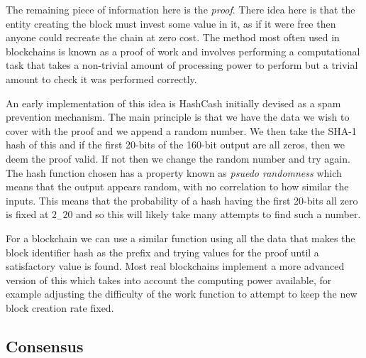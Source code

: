 The remaining piece of information here is the \emph{proof}. There idea here is that the entity creating the block must invest some value in it, as if it were free then anyone could recreate the chain at zero cost. The method most often used in blockchains is known as a proof of work and involves performing a computational task that takes a non-trivial amount of processing power to perform but a trivial amount to check it was performed correctly.

An early implementation of this idea is HashCash  initially devised as a spam prevention mechanism. The main principle is that we have the data we wish to cover with the proof and we append a random number. We then take the SHA-1 hash of this and if the first 20-bits of the 160-bit output are all zeros, then we deem the proof valid. If not then we change the random number and try again. The hash function chosen has a property known as \emph{psuedo randomness} which means that the output appears random, with no correlation to how similar the inputs. This means that the probability of a hash having the first 20-bits all zero is fixed at $2_-20$ and so this will likely take many attempts to find such a number.

For a blockchain we can use a similar function using all the data that makes the block identifier hash as the prefix and trying values for the proof until a satisfactory value is found. Most real blockchains implement a more advanced version of this which takes into account the computing power available, for example adjusting the difficulty of the work function to attempt to keep the new block creation rate fixed.


\subsection{Consensus}
\label{ch:blockchain:structure:consensus}

